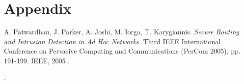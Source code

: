 \documentclass[a4paper,11pt]{article}
\begin{document}
\section{Appendix}


\footnotesize{  %
\begin{thebibliography}{N}

 A. Patwardhan, J. Parker, A. Joshi, M. Iorga, T. Karygiannis.
\textit{Secure Routing and Intrusion Detection in Ad Hoc Networks.}
Third IEEE International Conference on Pervasive Computing and Communications (PerCom 2005), pp. 191-199. IEEE, 2005 .


\end{thebibliography}.  
}
\end{document}
